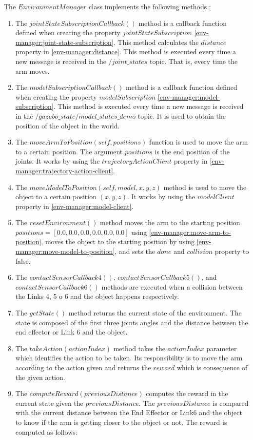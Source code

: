 \documentclass[12pt,oneside]{article}
\begin{document}
The $EnvironmentManager$ class implements the following methods :
\begin{enumerate}
\item The $jointStateSubscriptionCallback()$ method is a callback function defined when creating the property $jointStateSubscription$ \ref{env-manager:joint-state-subscription}. This method calculates the $distance$ property in \ref{env-manager:distance}. This method is executed every time a new message is received in the $/joint\_states$ topic. That is, every time the arm moves.
\item The $modelSubscriptionCallback()$ method is a callback function defined when creating the property $modelSubscription$ \ref{env-manager:model-subscription}. This method is executed every time a new message is received in the $/gazebo\_state/model\_states\_demo$ topic. It is used to obtain the position of the object in the world.
\item\label{env-manager:move-arm-to-position} The $moveArmToPosition(self, positions)$ function is used to move the arm to a certain position. The argument $positions$ is the end position of the joints. It works by using the $trajectoryActionClient$ property in \ref{env-manager:trajectory-action-client}.
\item\label{env-manager:move-model-to-position} The $moveModelToPosition(self, model, x, y, z)$ method is used to move the object to a certain position $(x, y, z)$. It works by using the $modelClient$ property in \ref{env-manager:model-client}.
\item The $resetEnvironment()$ method moves the arm to the starting position $positions = [0.0, 0.0, 0.0, 0.0, 0.0, 0.0]$ using \ref{env-manager:move-arm-to-position}, moves the object to the starting position by using \ref{env-manager:move-model-to-position}, and sets the $done$ and $collision$ property to false. 
\item The $contactSensorCallback4()$, $contactSensorCallback5()$, and $contactSensorCallback6()$ methods are executed when a collision between the Links 4, 5 o 6 and the object happens respectively.
\item The $getState()$ method returns the current state of the environment. The state is composed of the first three joints angles and the distance between the end effector or Link 6 and the object. 
\item The $takeAction(actionIndex)$ method takes the $actionIndex$ parameter which identifies the action to be taken. Its responsibility is to move the arm according to the action given and returns the $reward$ which is consequence of the given action.
\item The $computeReward(previousDistance)$ computes the reward in the current state given the $previousDistance$. The $previousDistance$ is compared with the current distance between the End Effector or Link6 and the object to know if the arm is getting closer to the object or not. The reward is computed as follows:\\


\end{enumerate}
\end{document}
